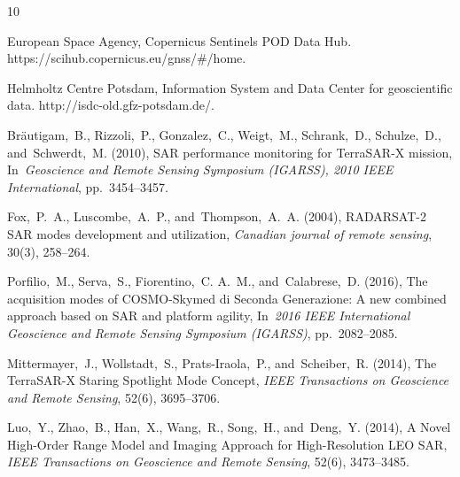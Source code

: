 \documentclass[pdfa]{drdc-report}
\begin{document}
\clearpage

\newcommand{\pauthor}[1]{#1}
\begin{thebibliography}{10}
\makeatletter
{}
\ifDRDC@isfrench
  \def\in{dans}\def\In{Dans}\def\of{de}\def\and{et}
  \def\online{en~ligne}\def\accessdate{Date d'acc\`es}
  \def\masters{th\`ese de Ma\^itrise}\def\phd{th\`ese de Doctorat}
\else
  \def\in{in}\def\In{In}\def\of{of}\def\and{and}
  \def\online{online}\def\accessdate{Access Date}
  \def\masters{Master's thesis}\def\phd{Ph.D.\ thesis}
\fi
\ifDRDC@isclassified\else\def\U{}\fi
\makeatother

\U European Space Agency, {Copernicus Sentinels POD Data Hub}.
\newblock https://scihub.copernicus.eu/gnss/\#/home.

\U Helmholtz Centre Potsdam, {Information System and Data Center for geoscientific data}.
\newblock http://isdc-old.gfz-potsdam.de/.

\U Br{\"a}utigam,~B., Rizzoli,~P., Gonzalez,~C., Weigt,~M., Schrank,~D.,
  Schulze,~D., \and\ Schwerdt,~M. (2010), {SAR performance monitoring for
  TerraSAR-X mission}, \In\ {\em {Geoscience and Remote Sensing Symposium
  (IGARSS), 2010 IEEE International}}, pp.~3454--3457.

\U Fox,~P.~A., Luscombe,~A.~P., \and\ Thompson,~A.~A. (2004), {{RADARSAT-2
  {SAR}} modes development and utilization}, {\em Canadian journal of remote
  sensing}, 30(3), 258--264.

\U Porfilio,~M., Serva,~S., Fiorentino,~C. A.~M., \and\ Calabrese,~D. (2016),
  The acquisition modes of COSMO-Skymed di Seconda Generazione: A new combined
  approach based on SAR and platform agility, \In\ {\em 2016 IEEE International
  Geoscience and Remote Sensing Symposium (IGARSS)}, pp.~2082--2085.

\U Mittermayer,~J., Wollstadt,~S., Prats-Iraola,~P., \and\ Scheiber,~R. (2014),
  The TerraSAR-X Staring Spotlight Mode Concept, {\em IEEE Transactions on
  Geoscience and Remote Sensing}, 52(6), 3695--3706.

\U {Luo},~Y., {Zhao},~B., {Han},~X., {Wang},~R., {Song},~H., \and\ {Deng},~Y.
  (2014), A Novel High-Order Range Model and Imaging Approach for
  High-Resolution LEO SAR, {\em IEEE Transactions on Geoscience and Remote
  Sensing}, 52(6), 3473--3485.


\end{thebibliography}
\end{document}
